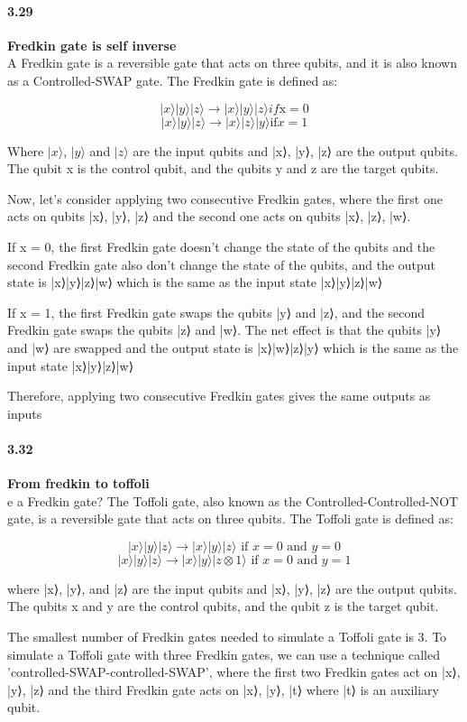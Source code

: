\paragraph{3.29} \textbf{Fredkin gate is self inverse}
\\

A Fredkin gate is a reversible gate that acts on three qubits, and it is also known as a Controlled-SWAP gate. The Fredkin gate is defined as:

$$|x⟩|y⟩|z⟩ → |x⟩|y⟩|z⟩ if \text{x} = 0$$
$$|x⟩|y⟩|z⟩ → |x⟩|z⟩|y⟩ \text{if} x = 1$$

Where $|x⟩$, $|y⟩$ and $|z⟩$ are the input qubits and |x⟩, |y⟩, |z⟩ are the output qubits. The qubit x is the control qubit, and the qubits y and z are the target qubits.

Now, let's consider applying two consecutive Fredkin gates, where the first one acts on qubits |x⟩, |y⟩, |z⟩ and the second one acts on qubits |x⟩, |z⟩, |w⟩.

If x = 0, the first Fredkin gate doesn't change the state of the qubits and the second Fredkin gate also don't change the state of the qubits, and the output state is |x⟩|y⟩|z⟩|w⟩ which is the same as the input state |x⟩|y⟩|z⟩|w⟩

If x = 1, the first Fredkin gate swaps the qubits |y⟩ and |z⟩, and the second Fredkin gate swaps the qubits |z⟩ and |w⟩. The net effect is that the qubits |y⟩ and |w⟩ are swapped and the output state is |x⟩|w⟩|z⟩|y⟩ which is the same as the input state |x⟩|y⟩|z⟩|w⟩

Therefore, applying two consecutive Fredkin gates gives the same outputs as inputs


\paragraph{3.32} \textbf{From fredkin to toffoli}
\\
e a Fredkin gate?
The Toffoli gate, also known as the Controlled-Controlled-NOT gate, is a reversible gate that acts on three qubits. The Toffoli gate is defined as:

$$|x⟩|y⟩|z⟩ → |x⟩|y⟩|z⟩ \text{ if } x = 0 \text{ and } y = 0 $$
$$|x⟩|y⟩|z⟩ → |x⟩|y⟩|z \otimes 1⟩ \text{ if } x = 0 \text{ and } y = 1$$

where |x⟩, |y⟩, and |z⟩ are the input qubits and |x⟩, |y⟩, |z⟩ are the output qubits. The qubits x and y are the control qubits, and the qubit z is the target qubit.

The smallest number of Fredkin gates needed to simulate a Toffoli gate is 3. To simulate a Toffoli gate with three Fredkin gates, we can use a technique called 'controlled-SWAP-controlled-SWAP', where the first two Fredkin gates act on |x⟩, |y⟩, |z⟩ and the third Fredkin gate acts on |x⟩, |y⟩, |t⟩ where |t⟩ is an auxiliary qubit.

